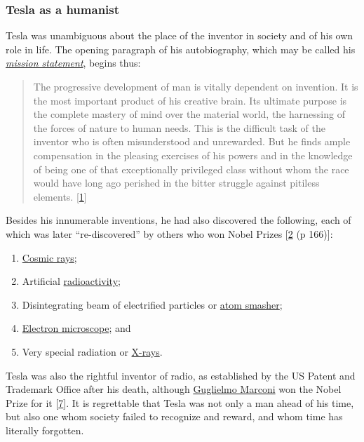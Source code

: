 \documentclass[
  a4paper,
]{article}
\providecommand{\tightlist}{%
  \setlength{\itemsep}{0pt}\setlength{\parskip}{0pt}}
\begin{document}
\hypertarget{tesla-as-a-humanist}{%
\subsubsection{Tesla as a humanist}\label{tesla-as-a-humanist}}

Tesla was unambiguous about the place of the inventor in society and of
his own role in life. The opening paragraph of his autobiography, which
may be called his
\href{https://en.wikipedia.org/wiki/Mission_statement}{\emph{mission
statement}}, begins thus:

\begin{quote}
The progressive development of man is vitally dependent on invention. It
is the most important product of his creative brain. Its ultimate
purpose is the complete mastery of mind over the material world, the
harnessing of the forces of nature to human needs. This is the difficult
task of the inventor who is often misunderstood and unrewarded. But he
finds ample compensation in the pleasing exercises of his powers and in
the knowledge of being one of that exceptionally privileged class
without whom the race would have long ago perished in the bitter
struggle against pitiless elements.
{[}\protect\hyperlink{ref-john83}{1}{]}
\end{quote}

Besides his innumerable inventions, he had also discovered the
following, each of which was later ``re-discovered'' by others who won
Nobel Prizes {[}\protect\hyperlink{ref-oneill80}{2} (p 166){]}:

\begin{enumerate}
\tightlist
\item
  \href{https://en.wikipedia.org/wiki/Cosmic_ray}{Cosmic rays};
\item
  Artificial
  \href{https://www.britannica.com/science/radioactivity}{radioactivity};
\item
  Disintegrating beam of electrified particles or
  \href{https://en.wikipedia.org/wiki/Particle_accelerator}{atom
  smasher};
\item
  \href{https://en.wikipedia.org/wiki/Electron_microscope}{Electron
  microscope}; and
\item
  Very special radiation or
  \href{https://en.wikipedia.org/wiki/X-ray}{X-rays}.
\end{enumerate}

Tesla was also the rightful inventor of radio, as established by the US
Patent and Trademark Office after his death, although
\href{https://en.wikipedia.org/wiki/Guglielmo_Marconi}{Guglielmo
Marconi} won the Nobel Prize for it
{[}\protect\hyperlink{ref-tesla-home}{7}{]}. It is regrettable that
Tesla was not only a man ahead of his time, but also one whom society
failed to recognize and reward, and whom time has literally forgotten.
\end{document}
